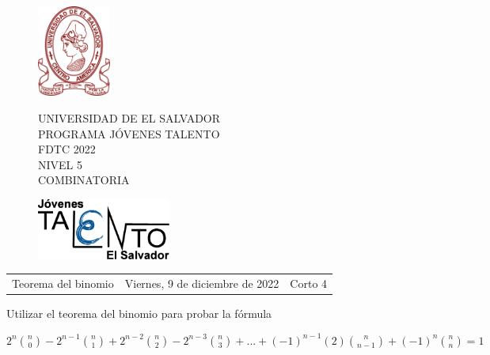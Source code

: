 \documentclass[12pt]{article}
\newcommand{\tema}{Teorema del binomio}
\newcommand{\fecha}{Viernes, 9 de diciembre de 2022}
\newcommand{\sesion}{Corto 4}
\begin{document}
\thispagestyle{empty}

\begin{figure}[h] 
	\begin{minipage}[b]{0.26\textwidth}
		\begin{center}
			\includegraphics[height=3cm]{Logos/UES.png}
			\par\end{center}
	\end{minipage} 
	\begin{minipage}[b]{0.46\textwidth}
		\begin{center}
			UNIVERSIDAD DE EL SALVADOR\\ [0.1cm]
			PROGRAMA JÓVENES TALENTO\\ [0.1cm]
	        FDTC 2022\\ [0.1cm]
                NIVEL 5\\ [0.1cm]
			COMBINATORIA 
			\par\end{center}
	\end{minipage} 
	\begin{minipage}[b]{0.05\textwidth}
		\begin{center}
			\includegraphics[height=2cm]{Logos/LOGO PJT.png}
			\par\end{center}
	\end{minipage}
\end{figure}

\begin{center}
    \begin{tabular}{p{4.5cm} p{7cm} p{4.5cm}}
        \tema & \centering\fecha & \hfill\sesion
    \end{tabular}
\end{center}

\begin{problema}
    Utilizar el teorema del binomio para probar la fórmula

    \begin{center}
        $2^{n} \binom{n}{0} - 2^{n-1} \binom{n}{1} + 2^{n-2} \binom{n}{2} - 2^{n-3} \binom{n}{3} + ... + (-1)^{n-1} (2) \binom{n}{n-1} + (-1)^{n} \binom{n}{n} = 1$
    \end{center}

\end{problema}
\end{document}
